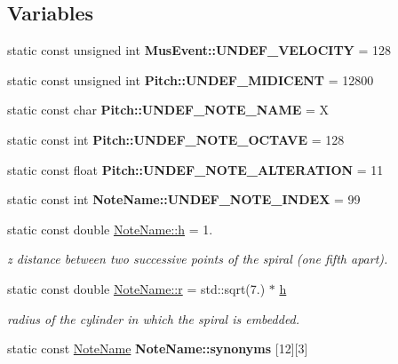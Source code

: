 \subsection*{Variables}
\begin{DoxyCompactItemize}
\item 
\mbox{\label{group__segment_ga5e0ecbf9869effe45cacf0c1a191615c}} 
static const unsigned int {\bfseries Mus\+Event\+::\+U\+N\+D\+E\+F\+\_\+\+V\+E\+L\+O\+C\+I\+TY} = 128
\item 
\mbox{\label{group__segment_ga8193b78df3a269acf7296393a522aafc}} 
static const unsigned int {\bfseries Pitch\+::\+U\+N\+D\+E\+F\+\_\+\+M\+I\+D\+I\+C\+E\+NT} = 12800
\item 
\mbox{\label{group__segment_ga8222a08cf48e372acab91765b3635ec5}} 
static const char {\bfseries Pitch\+::\+U\+N\+D\+E\+F\+\_\+\+N\+O\+T\+E\+\_\+\+N\+A\+ME} = \textquotesingle{}X\textquotesingle{}
\item 
\mbox{\label{group__segment_gad2dfc170c7179a5e8d1320edcbdf39ff}} 
static const int {\bfseries Pitch\+::\+U\+N\+D\+E\+F\+\_\+\+N\+O\+T\+E\+\_\+\+O\+C\+T\+A\+VE} = 128
\item 
\mbox{\label{group__segment_ga34db231ac148899756f4a87f8d84f15f}} 
static const float {\bfseries Pitch\+::\+U\+N\+D\+E\+F\+\_\+\+N\+O\+T\+E\+\_\+\+A\+L\+T\+E\+R\+A\+T\+I\+ON} = 11
\item 
\mbox{\label{group__segment_ga9e7612a2360f35684ff1228936e58a30}} 
static const int {\bfseries Note\+Name\+::\+U\+N\+D\+E\+F\+\_\+\+N\+O\+T\+E\+\_\+\+I\+N\+D\+EX} = 99
\item 
\mbox{\label{group__segment_ga51da52124dc1108e143b2a9f73537ada}} 
static const double \mbox{\hyperlink{group__segment_ga51da52124dc1108e143b2a9f73537ada}{Note\+Name\+::h}} = 1.
\begin{DoxyCompactList}\small\item\em z distance between two successive points of the spiral (one fifth apart). \end{DoxyCompactList}\item 
\mbox{\label{group__segment_ga814ef312c571ae51a0007c1d5a6a0b17}} 
static const double \mbox{\hyperlink{group__segment_ga814ef312c571ae51a0007c1d5a6a0b17}{Note\+Name\+::r}} = std\+::sqrt(7.) $\ast$ \mbox{\hyperlink{group__segment_ga51da52124dc1108e143b2a9f73537ada}{h}}
\begin{DoxyCompactList}\small\item\em radius of the cylinder in which the spiral is embedded. \end{DoxyCompactList}\item 
static const \mbox{\hyperlink{structNoteName}{Note\+Name}} {\bfseries Note\+Name\+::synonyms} \mbox{[}12\mbox{]}\mbox{[}3\mbox{]}
\end{DoxyCompactItemize}


